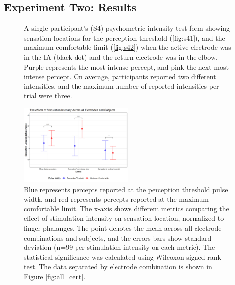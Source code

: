 \documentclass[10pt]{iopart}
\begin{document}
\subsection{Experiment Two: Results}
\begin{figure}[t]
  \centering
  \caption{A single participant's (S4) psychometric intensity test form showing sensation locations for the perception threshold (\ref{fig:s41}), and the maximum comfortable limit (\ref{fig:s42}) when the active electrode was in the IA (black dot) and the return electrode was in the elbow. Purple represents the most intense percept, and pink the next most intense percept. On average, participants reported two different intensities, and the maximum number of reported intensities per trial were three.}
  \label{fig:s4}
\end{figure}

\begin{figure}[b]
  \centering
  \includegraphics[width=0.5\textwidth,trim={0cm 0.5cm 0cm 0cm},clip]{fig/Stats_All_Envelopes.jpg}
  \caption{Blue represents percepts reported at the perception threshold pulse width, and red represents percepts reported at the maximum comfortable limit. The x-axis shows different metrics comparing the effect of stimulation intensity on sensation location, normalized to finger phalanges. The point denotes the mean across all electrode combinations and subjects, and the errors bars show standard deviation (n=99 per stimulation intensity on each metric). The statistical significance was calculated using Wilcoxon signed-rank test. The data separated by electrode combination is shown in Figure \ref{fig:all_cent}.}
  \label{fig:w_test_res}
\end{figure}
\end{document}
